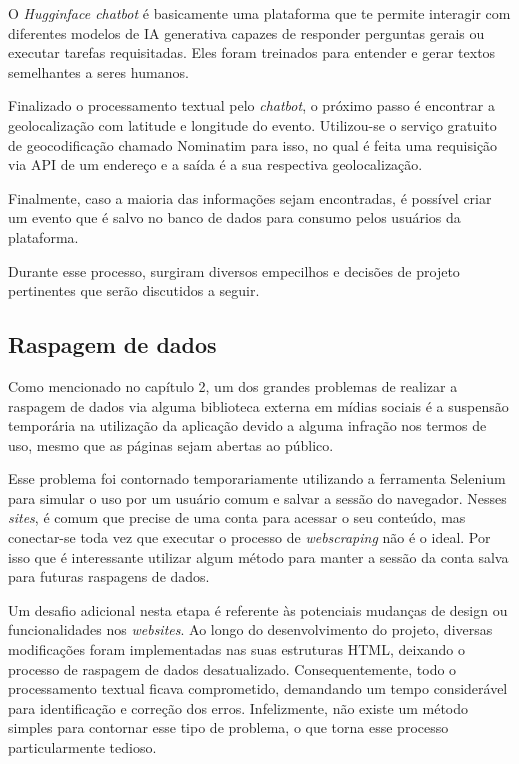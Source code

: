 O \textit{Hugginface chatbot} é basicamente uma plataforma que te permite
interagir com diferentes modelos de \ac{IA} generativa capazes de responder
perguntas gerais ou executar tarefas requisitadas. Eles foram treinados para
entender e gerar textos semelhantes a seres humanos.

Finalizado o processamento textual pelo \textit{chatbot}, o próximo passo é
encontrar a geolocalização com latitude e longitude do evento. Utilizou-se o
serviço gratuito de geocodificação chamado Nominatim para isso, no qual é feita
uma requisição via \acs{API} de um endereço e a saída é a sua respectiva
geolocalização.

Finalmente, caso a maioria das informações sejam encontradas, é possível criar
um evento que é salvo no banco de dados para consumo pelos usuários da
plataforma.

Durante esse processo, surgiram diversos empecilhos e decisões de projeto
pertinentes que serão discutidos a seguir.

\subsection{\textbf{Raspagem de dados}}

Como mencionado no capítulo 2, um dos grandes problemas de realizar a raspagem
de dados via alguma biblioteca externa em mídias sociais é a suspensão
temporária na utilização da aplicação devido a alguma infração nos termos de
uso, mesmo que as páginas sejam abertas ao público.

Esse problema foi contornado temporariamente utilizando a ferramenta Selenium
para simular o uso por um usuário comum e salvar a sessão do navegador. Nesses
\textit{sites}, é comum que precise de uma conta para acessar o seu conteúdo,
mas conectar-se toda vez que executar o processo de \textit{webscraping} não é
o ideal. Por isso que é interessante utilizar algum método para manter a sessão
da conta salva para futuras raspagens de dados.

Um desafio adicional nesta etapa é referente às potenciais mudanças de design
ou funcionalidades nos \textit{websites}. Ao longo do desenvolvimento do
projeto, diversas modificações foram implementadas nas suas estruturas HTML,
deixando o processo de raspagem de dados desatualizado. Consequentemente, todo
o processamento textual ficava comprometido, demandando um tempo considerável
para identificação e correção dos erros. Infelizmente, não existe um método
simples para contornar esse tipo de problema, o que torna esse processo
particularmente tedioso.

